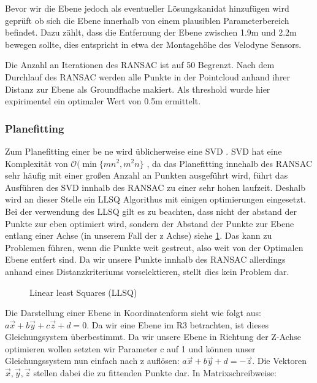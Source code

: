 \documentclass[11pt,oneside,openright]{mpreport}
\begin{document}
Bevor wir die Ebene jedoch als eventueller Lösungskanidat hinzufügen wird geprüft ob sich die Ebene innerhalb von einem plausiblen Parameterbereich befindet.
Dazu zählt, dass die Entfernung der Ebene zwischen 1.9m und 2.2m bewegen sollte, dies entspricht in etwa der Montagehöhe des Velodyne Sensors.

Die Anzahl an Iterationen des \ac{RANSAC} ist auf 50 Begrenzt. Nach dem Durchlauf des \ac{RANSAC} werden alle Punkte in der Pointcloud anhand ihrer Distanz zur Ebene als
Groundflache makiert. Als threshold wurde hier expirimentel ein optimaler Wert von 0.5m ermittelt.


\subsubsection{Planefitting}
\label{subssec:planefitting}
Zum Planefitting einer be ne wird üblicherweise eine \ac{SVD}  \cite{Nurunnabi2012,Ram2007,Soderkvist2009}.
SVD hat eine Komplexität von $\mathcal{O}(\min\{mn^2, m^2n\}$ \cite{Holmes2007}, da das Planefitting innehalb 
des \ac{RANSAC} sehr häufig mit einer großen Anzahl an Punkten ausgeführt wird, führt das Ausführen des \ac{SVD} innhalb des \ac{RANSAC} zu einer sehr hohen laufzeit.
Deshalb wird an dieser Stelle ein \ac{LLSQ} Algorithus mit einigen optimierungen eingesetzt. Bei der verwendung des \ac{LLSQ} gilt es zu beachten,
dass nicht der abstand der Punkte zur eben optimiert wird, sondern der Abstand der Punkte zur Ebene entlang einer Achse (in unserem Fall der z Achse) siehe \cref{LLSQ_MIN}.
Das kann zu Problemen führen, wenn die Punkte weit gestreut, also weit von der Optimalen Ebene entfert sind. Da wir unsere Punkte innhalb des \ac{RANSAC} allerdings anhand eines 
Distanzkriteriums vorselektieren, stellt dies kein Problem dar.

\begin{figure}[!ht]
\caption{Linear least Squares (LLSQ)  \cite{LLSQ}}

\label{LLSQ_MIN}
\end{figure}

Die Darstellung einer Ebene in Koordinatenform sieht wie folgt aus: $ a\vec{x} + b\vec{y} + c\vec{z} + d = 0 $. Da wir eine Ebene im R3 betrachten, ist dieses Gleichungsystem überbestimmt.
Da wir unsere Ebene in Richtung der Z-Achse optimieren wollen setzten wir Parameter c auf 1 und können unser Gleichungssystem nun einfach nach z auflösen: $a\vec{x} + b\vec{y} + d = -\vec{z}$.
Die Vektoren $\vec{x},\vec{y},\vec{z}$ stellen dabei die zu fittenden Punkte dar.
In Matrixschreibweise:
\end{document}
